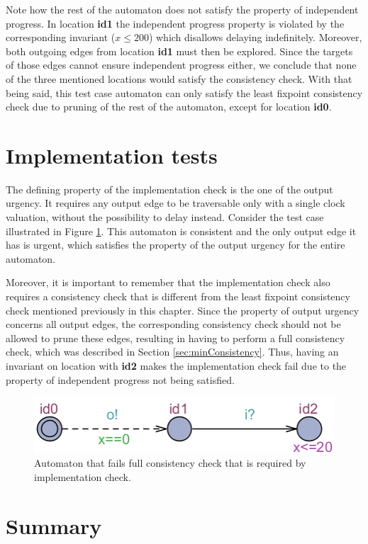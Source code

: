 Note how the rest of the automaton does not satisfy the property of independent progress. In location \textbf{id1} the independent progress property is violated by the corresponding invariant ($x\leq200$) which disallows delaying indefinitely. Moreover, both outgoing edges from location \textbf{id1} must then be explored. Since the targets of those edges cannot ensure independent progress either, we conclude that none of the three mentioned locations would satisfy the consistency check. With that being said, this test case automaton can only satisfy the least fixpoint consistency check due to pruning of the rest of the automaton, except for location \textbf{id0}.


\section{Implementation tests}
The defining property of the implementation check is the one of the output urgency. It requires any output edge to be traversable only with a single clock valuation, without the possibility to delay instead. Consider the test case illustrated in Figure \ref{fig:G19}. This automaton is consistent and the only output edge it has is urgent, which satisfies the property of the output urgency for the entire automaton. 

Moreover, it is important to remember that the implementation check also requires a consistency check that is different from the least fixpoint consistency check mentioned previously in this chapter. Since the property of output urgency concerns all output edges, the corresponding consistency check should not be allowed to prune these edges, resulting in having to perform a full consistency check, which was described in Section \ref{sec:minConsistency}. Thus, having an invariant on location with \textbf{id2} makes the implementation check fail due to the property of independent progress not being satisfied.
\begin{figure}
    \centering
    \includegraphics[scale = 0.7]{figures/G19.png}
    \caption{Automaton that fails full consistency check that is required by implementation check.}
    \label{fig:G19}
\end{figure}

\section{Summary}

